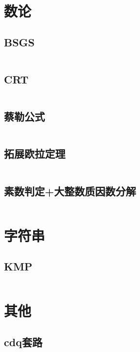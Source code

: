 \documentclass{article}
\begin{document}
\newpage
\section{数论}
\subsection{BSGS}
\inputminted[breaklines]{c++}{../数论/BSGS.cpp}

\subsection{CRT}
\inputminted[breaklines]{c++}{../数论/CRT.cpp}

\subsection{蔡勒公式}
\inputminted[breaklines]{c++}{../数论/蔡勒公式.cpp}

\subsection{拓展欧拉定理}
\inputminted[breaklines]{c++}{../数论/拓展欧拉定理.cpp}

\subsection{素数判定+大整数质因数分解}
\inputminted[breaklines]{c++}{../数论/素数判定+大整数质因数分解.cpp}

\newpage
\section{字符串}
\subsection{KMP}
\inputminted[breaklines]{c++}{../字符串/KMP.cpp}

\newpage
\section{其他}

\subsection{cdq套路}
\inputminted[breaklines]{text}{../其他/cdq.cpp}
\end{document}
